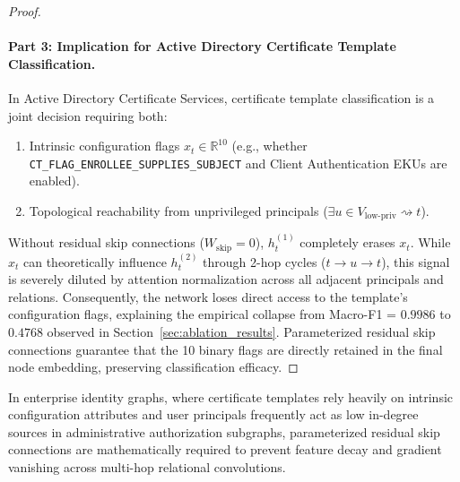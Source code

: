 \begin{proof}
\paragraph{Part 3: Implication for Active Directory Certificate Template Classification.}
In Active Directory Certificate Services, certificate template classification is a joint decision requiring both:
\begin{enumerate}
    \item Intrinsic configuration flags $x_t \in \mathbb{R}^{10}$ (e.g., whether \texttt{CT\_FLAG\_ENROLLEE\_SUPPLIES\_SUBJECT} and Client Authentication EKUs are enabled).
    \item Topological reachability from unprivileged principals ($\exists u \in V_{\text{low-priv}} \rightsquigarrow t$).
\end{enumerate}
Without residual skip connections ($W_{\text{skip}} = 0$), $h_t^{(1)}$ completely erases $x_t$. While $x_t$ can theoretically influence $h_t^{(2)}$ through 2-hop cycles ($t \to u \to t$), this signal is severely diluted by attention normalization across all adjacent principals and relations. Consequently, the network loses direct access to the template's configuration flags, explaining the empirical collapse from Macro-F1 = $0.9986$ to $0.4768$ observed in Section~\ref{sec:ablation_results}. Parameterized residual skip connections guarantee that the 10 binary flags are directly retained in the final node embedding, preserving classification efficacy.
\end{proof}

\begin{corollary}
In enterprise identity graphs, where certificate templates rely heavily on intrinsic configuration attributes and user principals frequently act as low in-degree sources in administrative authorization subgraphs, parameterized residual skip connections are mathematically required to prevent feature decay and gradient vanishing across multi-hop relational convolutions.
\end{corollary}
